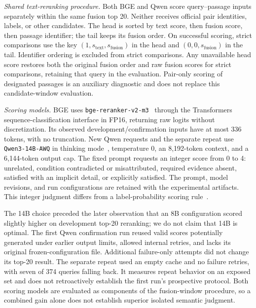 \textit{Shared text-reranking procedure.} Both BGE and Qwen score query--passage inputs separately within the same fusion top 20. Neither receives official pair identities, labels, or other candidates. The head is sorted by text score, then fusion score, then passage identifier; the tail keeps its fusion order. On successful scoring, strict comparisons use the key $(1,s_{\mathrm{text}},s_{\mathrm{fusion}})$ in the head and $(0,0,s_{\mathrm{fusion}})$ in the tail. Identifier ordering is excluded from strict comparisons. Any unavailable head score restores both the original fusion order and raw fusion scores for strict comparisons, retaining that query in the evaluation. Pair-only scoring of designated passages is an auxiliary diagnostic and does not replace this candidate-window evaluation.

\textit{Scoring models.} BGE uses \texttt{bge-reranker-v2-m3}~\cite{bgeRerankerCard} through the Transformers sequence-classification interface in FP16, returning raw logits without discretization. Its observed development/confirmation inputs have at most 336 tokens, with no truncation. New Qwen requests and the separate repeat use \texttt{Qwen3-14B-AWQ} in thinking mode~\cite{yang2025qwen3}, temperature 0, an 8,192-token context, and a 6,144-token output cap. The fixed prompt requests an integer score from 0 to 4: unrelated, condition contradicted or misattributed, required evidence absent, satisfied with an implicit detail, or explicitly satisfied. The prompt, model revisions, and run configurations are retained with the experimental artifacts. This integer judgment differs from a label-probability scoring rule~\cite{zhuang-etal-2024-beyond}.

The 14B choice preceded the later observation that an 8B configuration scored slightly higher on development top-20 reranking; we do not claim that 14B is optimal. The first Qwen confirmation run reused valid scores potentially generated under earlier output limits, allowed internal retries, and lacks its original frozen-configuration file. Additional failure-only attempts did not change its top-20 result. The separate repeat used an empty cache and no failure retries, with seven of 374 queries falling back. It measures repeat behavior on an exposed set and does not retroactively establish the first run's prospective protocol. Both scoring models are evaluated as components of the fusion-window procedure, so a combined gain alone does not establish superior isolated semantic judgment.

